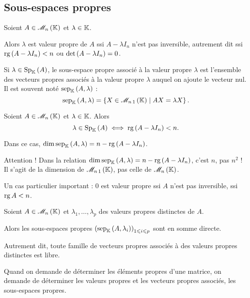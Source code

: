 \subsection{Sous-espaces propres}

\begin{prop}
Soient \(A\in\M{n}\) et \(\lambda\in\mathbb{K}\).

Alors \(\lambda\) est valeur propre de \(A\) ssi \(A-\lambda I_n\) n'est pas inversible, autrement dit ssi \(\operatorname{rg}\left(A-\lambda I_n\right)<n\) ou \(\det\left(A-\lambda I_n\right)=0\).
\end{prop}

Si \(\lambda\in\Sp[\K]{A}\), le sous-espace propre associé à la valeur propre \(\lambda\) est l'ensemble des vecteurs propres associés à la valeur propre \(\lambda\) auquel on ajoute le vecteur nul. Il est souvent noté \(\sep[\K]{A}{\lambda}\) : \[\sep[\K]{A}{\lambda}=\accol{X\in\M{n\,1}\tq AX=\lambda X}.\]

\begin{prop}
Soient \(A\in\M{n}\) et \(\lambda\in\mathbb{K}\). Alors \[\lambda\in\Sp[\K]{A}\ssi\rg\paren{A-\lambda I_n}<n.\]

Dans ce cas, \(\dim\sep[\K]{A}{\lambda}=n-\rg\paren{A-\lambda I_n}\).
\end{prop}

Attention ! Dans la relation \(\dim\sep[\K]{A}{\lambda}=n-\rg\paren{A-\lambda I_n}\), c'est \(n\), pas \(n^2\) ! Il s'agit de la dimension de \(\M{n\,1}\), pas celle de \(\M{n}\).

\begin{rem}
Un cas particulier important : \(0\) est valeur propre ssi \(A\) n'est pas inversible, \cad ssi \(\operatorname{rg} A<n\).
\end{rem}

\begin{theo}
Soient \(A\in\M{n}\) et \(\lambda_1,\dots,\lambda_p\) des valeurs propres distinctes de \(A\).

Alors les sous-espaces propres \(\paren{\sep[\K]{A}{\lambda_i}}_{1\leq i\leq p}\) sont en somme directe.

Autrement dit, toute famille de vecteurs propres associés à des valeurs propres distinctes est libre.
\end{theo}

\begin{rem}
Quand on demande de déterminer les éléments propres d'une matrice, on demande de déterminer les valeurs propres et les vecteurs propres associés, \ie les sous-espaces propres.
\end{rem}

